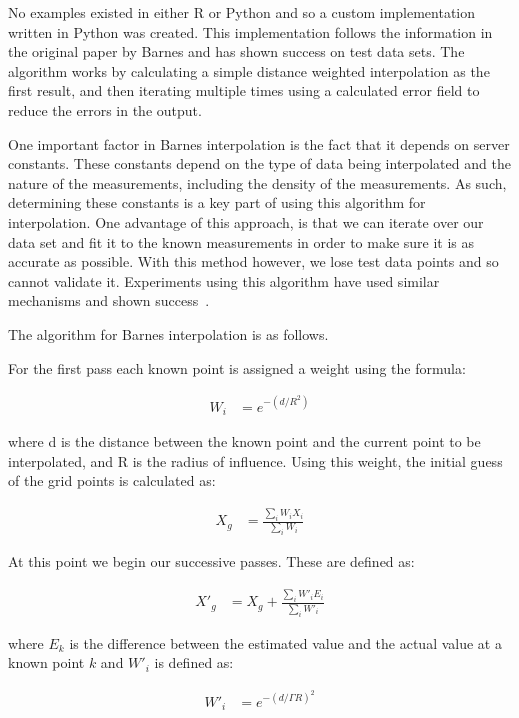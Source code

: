 				No examples existed in either R or Python and so a custom implementation written in Python was created. This implementation follows the information in the original paper by Barnes and has shown success on test data sets. The algorithm works by calculating a simple distance weighted interpolation as the first result, and then iterating multiple times using a calculated error field to reduce the errors in the output. 

				One important factor in Barnes interpolation is the fact that it depends on server constants. These constants depend on the type of data being interpolated and the nature of the measurements, including the density of the measurements. As such, determining these constants is a key part of using this algorithm for interpolation. One advantage of this approach, is that we can iterate over our data set and fit it to the known measurements in order to make sure it is as accurate as possible. With this method however, we lose test data points and so cannot validate it. Experiments using this algorithm have used similar mechanisms and shown success~\cite{pmconcentrationmaps}.

				The algorithm for Barnes interpolation is as follows.

				For the first pass each known point is assigned a weight using the formula: 

				\begin{align*}
					W_{i} &= e^{-(d/R^{2})}
				\end{align*}
				
				where d is the distance between the known point and the current point to be interpolated, and R is the radius of influence. Using this weight, the initial guess of the grid points is calculated as: 
				
				\begin{align*}
					X_{g} &= \frac{\sum_{i}{W_{i}X_{i}}}{\sum_{i}{W_{i}}}
				\end{align*}

				At this point we begin our successive passes. These are defined as:

				\begin{align*}
					X'_{g} &= X_{g} + \frac{\sum_{i}{W'_{i}E_{i}}}{\sum_{i}{W'_{i}}}
				\end{align*}

				where $E_{k}$ is the difference between the estimated value and the actual value at a known point $k$ and $W'_{i}$ is defined as:

				\begin{align*}
					W'_{i} &= e^{-(d/\Gamma R)^{2}}
				\end{align*}

